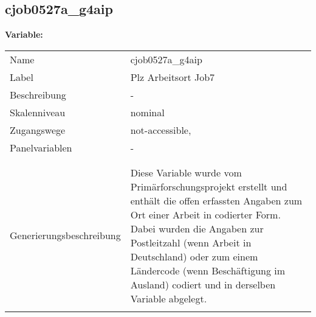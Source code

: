 	
	
	\subsection{cjob0527a\_g4aip}
	\label{subSection:cjob0527a_g4aip}

	\noindent\textbf{Variable:}\\
		\begin{tabular}{lL{11.3cm}}
			\label{tableVariable:cjob0527a_g4aip}
			Name & cjob0527a\_g4aip \\
			Label & Plz Arbeitsort Job7 \\
			Beschreibung & - \\
			Skalenniveau & nominal \\
			Zugangswege &
				not-accessible,
 \\
			Panelvariablen & -
			 \\
			 \\
 \\
					Generierungsbeschreibung & Diese Variable wurde vom Primärforschungsprojekt erstellt und enthält die offen erfassten Angaben zum Ort einer Arbeit in codierter Form. Dabei wurden die Angaben zur Postleitzahl (wenn Arbeit in Deutschland) oder zum einem Ländercode (wenn Beschäftigung im Ausland) codiert und in derselben Variable abgelegt.
				 \\	
			 \\
		\end{tabular}






	
	\newpage
